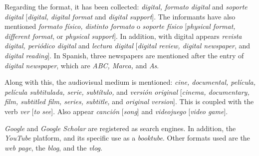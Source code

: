 \documentclass[english]{textolivre}
\begin{document}
Regarding the format, it has been collected: \textit{digital, formato digital} and \textit{soporte digital} [\textit{digital, digital format} and \textit{digital support}]. The informants have also mentioned \textit{formato físico, distinto formato} o \textit{soporte físico} [\textit{physical format, different format}, or \textit{physical support}]. In addition, with digital appears \textit{revista digital, periódico digital} and \textit{lectura digital} [\textit{digital review, digital newspaper}, and \textit{digital reading}]. In Spanish, three newspapers are mentioned after the entry of \textit{digital newspaper}, which are \textit{ABC, Marca,} and \textit{As}.

Along with this, the audiovisual medium is mentioned: \textit{cine, documental, película, película subtitulada, serie, subtítulo,} and \textit{versión original} [\textit{cinema, documentary, film, subtitled film, series, subtitle,} and \textit{original version}]. This is coupled with the verb \textit{ver} [\textit{to see}]. Also appear \textit{canción} [\textit{song}] and \textit{videojuego} [\textit{video game}].

\textit{Google} and \textit{Google Scholar} are registered as search engines. In addition, the \textit{YouTube} platform, and its specific use as a \textit{booktube}. Other formats used are the \textit{web page}, the \textit{blog}, and the \textit{vlog}.
\end{document}
